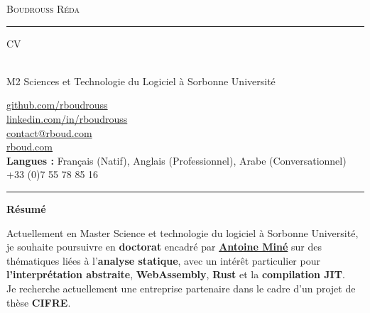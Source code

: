 \documentclass[10pt,A4]{article}
\newcommand{\cvsection}[1]
{
	\begin{center}
		\large\textcolor{sectcol}{\textbf{#1}}
	\end{center}
}
\newcommand{\metasection}[2]
{
\footnotesize{#2} \hspace*{\fill} \footnotesize{#1}\\[1pt]
}
\begin{document}
\pagestyle{fancy}	









\vspace{-8pt}
\begin{center}
    {\HUGE \textsc{Boudrouss Réda} \textcolor{sectcol}{\rule[-1mm]{1mm}{0.9cm}} \textsc{CV}}\\[2pt]
    {\small M2 Sciences et Technologie du Logiciel à Sorbonne Université}
\end{center}

\vspace{6pt}

\metasection{\href{https://github.com/rboudrouss}{github.com/rboudrouss}}{}
\metasection{\href{https://www.linkedin.com/in/rboudrouss}{linkedin.com/in/rboudrouss}}{}
\metasection{\href{mailto:contact@rboud.com}{contact@rboud.com}}{}
\metasection{\href{https://rboud.com}{rboud.com}}{}
\metasection{+33 (0)7 55 78 85 16}{\textbf{Langues :} Français (Natif), Anglais (Professionnel), Arabe (Conversationnel)}

\vspace{-15pt}
\textcolor{softcol}{\hrule}

\normalsize

\cvsection{Résumé}
Actuellement en Master Science et technologie du logiciel à Sorbonne Université, je souhaite poursuivre en \textbf{doctorat} encadré par \href{https://mine.perso.lip6.fr/index.html.fr}{\textbf{Antoine Miné}} sur des thématiques liées à l'\textbf{analyse statique}, avec un intérêt particulier pour \textbf{l'interprétation abstraite}, \textbf{WebAssembly}, \textbf{Rust} et la \textbf{compilation JIT}. \\
Je recherche actuellement une entreprise partenaire dans le cadre d'un projet de thèse \textbf{CIFRE}.
\end{document}
